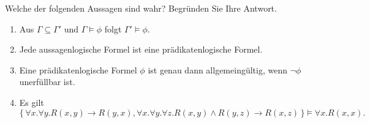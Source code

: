 \documentclass[german]{latteachCD}[2017/03/28]
\begin{document}
\begin{exercise}
  Welche der folgenden Aussagen sind wahr?  Begründen Sie Ihre Antwort.
  \begin{enumerate}
  \item Aus $\Gamma \subseteq \Gamma'$ und $\Gamma \models \phi$ folgt $\Gamma'
    \models \phi$.
  \item Jede aussagenlogische Formel ist eine prädikatenlogische Formel.
  \item Eine prädikatenlogische Formel $\phi$ ist genau dann allgemeingültig,
    wenn $\lnot \phi$ unerfüllbar ist.
  \item Es gilt
    \begin{equation*}
      \{\,\forall x. \forall y. R(x,y) \to R(y,x), \forall x. \forall y. \forall
      z. R(x,y) \land R(y,z) \to R(x,z)\,\} \models \forall x. R(x,x).
    \end{equation*}
  \end{enumerate}

\end{exercise}
\end{document}
